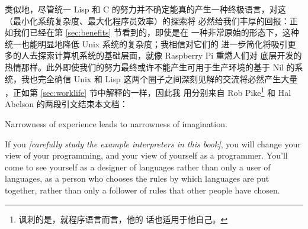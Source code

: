 类似地，尽管统一 Lisp 和 C 的努力并不确定能真的产生一种终极语言，对这%
（最小化系统复杂度、最大化程序员效率）的探索将
必然给我们丰厚的回报：正如我们已经在第 \ref{sec:benefits} 节看到的，即使是在
一种非常原始的形态下，这种统一也能明显地降低 Unix 系统的复杂度；我相信对它们的
进一步简化将吸引更多的人去探索计算机系统的基础层面，就像 Raspberry Pi 重燃人们对
底层开发的热情那样。此外即使我们的努力最终或许不能产生可用于生产环境的基于 Nil
的系统，我也完全确信 Unix 和 Lisp 这两个圈子之间深刻见解的交流将必然产生大量%
，正如第 \ref{sec:worklife} 节中解释的一样，因此我
用分别来自 Rob Pike\footnote{讽刺的是，就程序语言而言，他的
话也适用于他自己。} 和 Hal Abelson 的两段引文结束本文档：
\pagebreak
\begin{quoting}
	Narrowness of experience leads to narrowness of imagination.
\end{quoting}
\colskipc
\begin{quoting}
	If you \emph{[carefully study the example interpreters in this book]},
	you will change your view of your programming, and your view of
	yourself as a programmer.  You'll come to see yourself as a designer
	of languages rather than only a user of languages, as a person
	who chooses the rules by which languages are put together, rather
	than only a follower of rules that other people have chosen.
\end{quoting}

